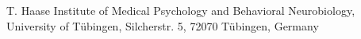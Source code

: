 
                {T. Haase}
                {Institute of Medical Psychology and Behavioral Neurobiology, University of Tübingen, Silcherstr. 5, 72070 Tübingen, Germany}
                